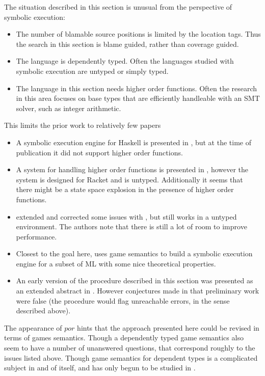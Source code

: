 The situation described in this section is unusual from the perspective of symbolic execution:
\begin{itemize}
\item The number of blamable source positions is limited by the location tags.
Thus the search in this section is blame guided, rather than coverage guided.
\item The language is dependently typed.
Often the languages studied with symbolic execution are untyped or simply typed.
\item The language in this section needs higher order functions.
Often the research in this area focuses on base types that are efficiently handleable with an SMT solver, such as integer arithmetic.
\end{itemize}
This limits the prior work to relatively few papers
\begin{itemize}
\item
A symbolic execution engine for Haskell is presented in \cite{10.1145/3314221.3314618}, but at the time of publication it did not support higher order functions.
\item
A system for handling higher order functions is presented in \cite{nguyen2017higher}, however the system is designed for Racket and is untyped.
Additionally it seems that there might be a state space explosion in the presence of higher order functions.
\item \cite{10.1007/978-3-030-72019-3_23} extended and corrected some issues with \cite{nguyen2017higher}, but still works in a untyped environment.
The authors note that there is still a lot of room to improve performance.
\item Closest to the goal here, \cite{lin_et_al:LIPIcs:2020:12349} uses game semantics to build a symbolic execution engine for a subset of ML with some nice theoretical properties.
\item An early version of the procedure described in this section was presented as an extended abstract in \cite{extendedabstract}.
However conjectures made in that preliminary work were false (the procedure would flag unreachable errors, in the sense described above).
\end{itemize}
The appearance of $por$ hints that the approach presented here could be revised in terms of games semantics.
Though a dependently typed game semantics also seem to have a number of unanswered questions, that correspond roughly to the issues listed above.
Though game semantics for dependent types is a complicated subject in and of itself, and has only begun to be studied in \cite{VAKAR2018401}.



